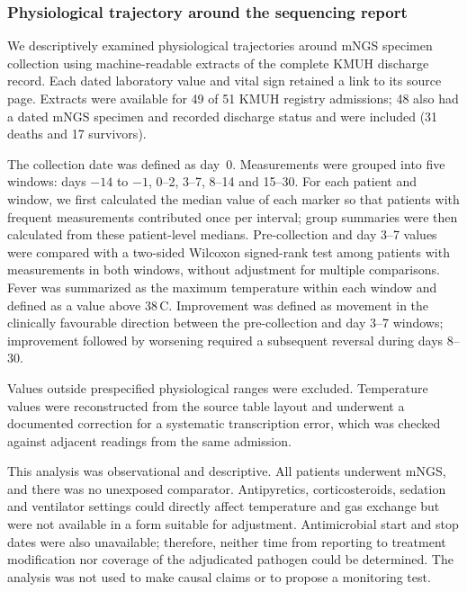 \documentclass[11pt,a4paper]{article}
\newcommand{\mngs}{mNGS\xspace}
\newcommand{\kmuh}{KMUH\xspace}
\begin{document}
\subsubsection*{Physiological trajectory around the sequencing report}
We descriptively examined physiological trajectories around \mngs specimen collection using machine-readable extracts of the complete \kmuh discharge record. Each dated laboratory value and vital sign retained a link to its source page. Extracts were available for 49 of 51 \kmuh registry admissions; 48 also had a dated \mngs specimen and recorded discharge status and were included (31 deaths and 17 survivors).

The collection date was defined as day~0. Measurements were grouped into five windows: days $-14$ to $-1$, 0--2, 3--7, 8--14 and 15--30. For each patient and window, we first calculated the median value of each marker so that patients with frequent measurements contributed once per interval; group summaries were then calculated from these patient-level medians. Pre-collection and day 3--7 values were compared with a two-sided Wilcoxon signed-rank test among patients with measurements in both windows, without adjustment for multiple comparisons. Fever was summarized as the maximum temperature within each window and defined as a value above 38\,\textdegree C. Improvement was defined as movement in the clinically favourable direction between the pre-collection and day 3--7 windows; improvement followed by worsening required a subsequent reversal during days 8--30.

Values outside prespecified physiological ranges were excluded. Temperature values were reconstructed from the source table layout and underwent a documented correction for a systematic transcription error, which was checked against adjacent readings from the same admission.

This analysis was observational and descriptive. All patients underwent \mngs, and there was no unexposed comparator. Antipyretics, corticosteroids, sedation and ventilator settings could directly affect temperature and gas exchange but were not available in a form suitable for adjustment. Antimicrobial start and stop dates were also unavailable; therefore, neither time from reporting to treatment modification nor coverage of the adjudicated pathogen could be determined. The analysis was not used to make causal claims or to propose a monitoring test.
\end{document}
